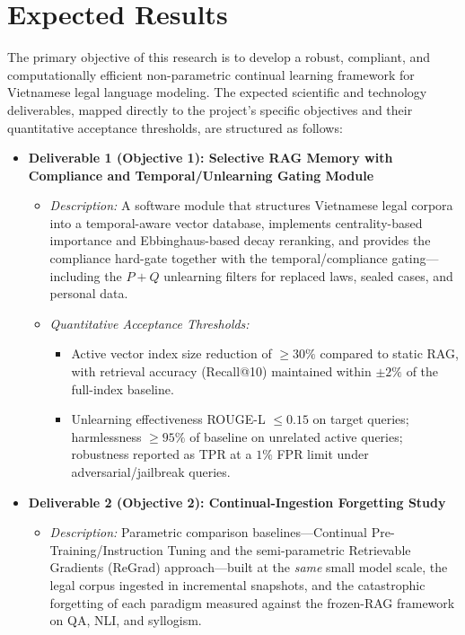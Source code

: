 \section{Expected Results}

The primary objective of this research is to develop a robust, compliant, and computationally efficient non-parametric continual learning framework for Vietnamese legal language modeling. The expected scientific and technology deliverables, mapped directly to the project's specific objectives and their quantitative acceptance thresholds, are structured as follows:

\begin{itemize}[leftmargin=*]
    \item \textbf{Deliverable 1 (Objective 1): Selective RAG Memory with Compliance and Temporal/Unlearning Gating Module}
    \begin{itemize}
        \item \textit{Description:} A software module that structures Vietnamese legal corpora into a temporal-aware vector database, implements centrality-based importance and Ebbinghaus-based decay reranking, and provides the compliance hard-gate together with the temporal/compliance gating---including the $P+Q$ unlearning filters for replaced laws, sealed cases, and personal data.
        \item \textit{Quantitative Acceptance Thresholds:}
        \begin{itemize}
            \item Active vector index size reduction of $\ge 30\%$ compared to static RAG, with retrieval accuracy (Recall@10) maintained within $\pm 2\%$ of the full-index baseline.
            \item Unlearning effectiveness ROUGE-L $\le 0.15$ on target queries; harmlessness $\ge 95\%$ of baseline on unrelated active queries; robustness reported as TPR at a $1\%$ FPR limit under adversarial/jailbreak queries.
        \end{itemize}
    \end{itemize}
    \newpage
    \item \textbf{Deliverable 2 (Objective 2): Continual-Ingestion Forgetting Study}
    \begin{itemize}
        \item \textit{Description:} Parametric comparison baselines---Continual Pre-Training/Instruction Tuning and the semi-parametric Retrievable Gradients (ReGrad) approach---built at the \emph{same} small model scale, the legal corpus ingested in incremental snapshots, and the catastrophic forgetting of each paradigm measured against the frozen-RAG framework on QA, NLI, and syllogism.

\end{itemize}
\end{itemize}
